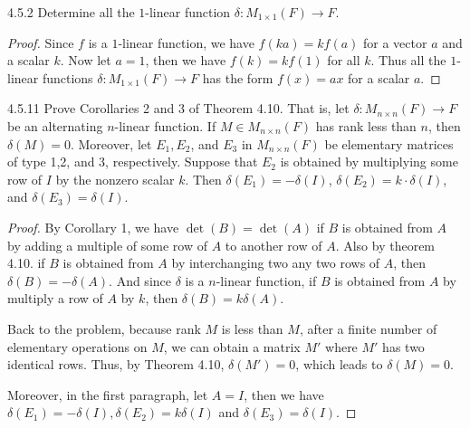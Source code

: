 \documentclass[12pt, a4paper]{article}
\theoremstyle{plain}
\begin{document}
\begin{exercise}{4.5.2}
Determine all the $1$-linear function $\delta:M_{1\times 1}(F)\rightarrow F$.
\end{exercise}
	\begin{proof}
	Since $f$ is a $1$-linear function, we have $f(ka)=kf(a)$ for a vector $a$ and a scalar $k$. Now let $a=1$, then we have $f(k)=kf(1)$ for all $k$. Thus all the $1$-linear functions $\delta:M_{1\times 1}(F)\rightarrow F$ has the form $f(x)=ax$ for a scalar $a$.
	\end{proof}
\begin{exercise}{4.5.11}
Prove Corollaries 2 and 3 of Theorem 4.10. That is, let $\delta:M_{n\times n}(F)\rightarrow F$ be an alternating $n$-linear function. If $M\in M_{n\times n}(F)$ has rank less than $n$, then $\delta (M)=0$. Moreover, let $E_1,E_2$, and $E_3$ in $M_{n\times n}(F)$ be elementary matrices of type 1,2, and 3, respectively. Suppose that $E_2$ is obtained by multiplying some row of $I$ by the nonzero scalar $k$. Then $\delta(E_1)=-\delta(I)$, $\delta(E_2)=k\cdot \delta(I)$, and $\delta(E_3)=\delta(I)$.
\end{exercise}
	\begin{proof}
	By Corollary 1, we have $\det(B)=\det(A)$ if $B$ is obtained from $A$ by adding a multiple of some row of $A$ to another row of $A$. Also by theorem 4.10. if $B$ is obtained from $A$ by interchanging two any two rows of $A$, then $\delta(B)=-\delta(A)$. And since $\delta$ is a $n$-linear function, if $B$ is obtained from $A$ by multiply a row of $A$ by $k$, then $\delta(B)=k\delta(A)$. 
	
	Back to the problem, because rank $M$ is less than $M$, after a finite number of elementary operations on $M$, we can obtain a matrix $M'$ where $M'$ has two identical rows. Thus, by Theorem 4.10, $\delta(M')=0$, which leads to $\delta(M)=0$.
	
	Moreover, in the first paragraph, let $A=I$, then we have $\delta(E_1)=-\delta(I), \delta(E_2)=k\delta(I)$ and $\delta(E_3)=\delta(I)$.
	\end{proof}

\pagebreak
\end{document}
